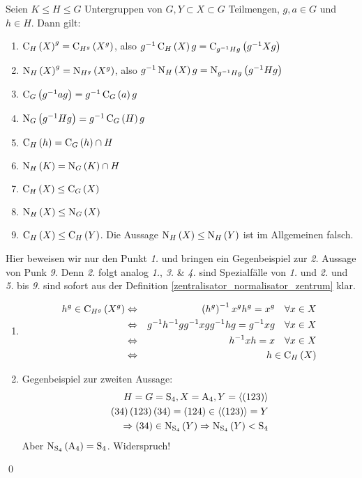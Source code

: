 \begin{satz}
 \label{satz_uber_cen_und_norm}
 Seien $K\leq H \leq G$ Untergruppen von $G, Y \subset X \subset G$ Teilmengen, $g,a \in G$ und $h \in H$. Dann gilt:
 \begin{enumerate}
  \item $\operatorname{C}_H\left(X\right)^g = \operatorname{C}_{H^g}\left(X^g\right)$, also $g^{-1}\operatorname{C}_H\left(X\right)g = \operatorname{C}_{g^{-1}Hg}\left(g^{-1}Xg\right)$
  \item $\operatorname{N}_H\left(X\right)^g = \operatorname{N}_{H^g}\left(X^g\right)$, also $g^{-1}\operatorname{N}_H\left(X\right)g = \operatorname{N}_{g^{-1}Hg}\left(g^{-1}Hg\right)$
  \item $\operatorname{C}_G\left(g^{-1}ag\right) = g^{-1}\operatorname{C}_G\left(a\right)g$
  \item $\operatorname{N}_G\left(g^{-1}Hg\right) = g^{-1}\operatorname{C}_G\left(H\right)g$
  \item $\operatorname{C}_H\left(h\right) = \operatorname{C}_G\left(h\right)\cap H$
  \item $\operatorname{N}_H\left(K\right) = \operatorname{N}_G\left(K\right)\cap H$
  \item $\operatorname{C}_H\left(X\right) \leq\operatorname{C}_G\left(X\right)$
  \item $\operatorname{N}_H\left(X\right) \leq\operatorname{N}_G\left(X\right)$
  \item \label{cenx_ugr_ceny} $\operatorname{C}_H\left(X\right) \leq \operatorname{C}_H\left(Y\right)$. Die Aussage $\operatorname{N}_H\left(X\right) \leq \operatorname{N}_H\left(Y\right)$ ist im Allgemeinen falsch.
 \end{enumerate}
\end{satz}

\begin{beweis}
 Hier beweisen wir nur den Punkt \emph{1.} und bringen ein Gegenbeispiel zur \emph{2.} Aussage von Punk \emph{9.} Denn \emph{2.} folgt analog \emph{1.}, \emph{3.} \& \emph{4.} sind Spezialf\"alle von \emph{1.} und \emph{2.} und \emph{5.} bis \emph{9.} sind sofort aus der Definition \ref{zentralisator_normalisator_zentrum} klar.
 \begin{enumerate}
  \item
   \begin{eqnarray*}
    h^g \in \operatorname{C}_{H^g}\left(X^g\right) &\Leftrightarrow& \left(h^g\right)^{-1}x^g h^g = x^g \quad \forall x \in X\\&\Leftrightarrow& g^{-1}h^{-1}gg^{-1}xgg^{-1}hg=g^{-1}xg \quad \forall x \in X\\&\Leftrightarrow&h^{-1}xh=x \quad \forall x \in X\\&\Leftrightarrow& h \in \operatorname{C}_H\left(X\right)
   \end{eqnarray*}
  \setcounter{enumi}{8}
  \item Gegenbeispiel zur zweiten Aussage:
   \begin{eqnarray*}
    H=G=\operatorname{S}_4, X=\operatorname{A}_4, Y=\left< \left(1 2 3\right) \right>\\\left(3 4\right)\left(1 2 3\right)\left(3 4\right) = \left(1 2 4\right) \in \left<\left(1 2 3\right)\right>=Y\\\Rightarrow \left(3 4\right) \in \operatorname{N}_{\operatorname{S}_4}\left(Y\right) \Rightarrow \operatorname{N}_{\operatorname{S}_4}\left(Y\right) < \operatorname{S}_4
   \end{eqnarray*}
  Aber $\operatorname{N}_{\operatorname{S}_4}\left(\operatorname{A}_4\right) = \operatorname{S}_4$.  Widerspruch!
 \end{enumerate}
 \qed
\end{beweis}

